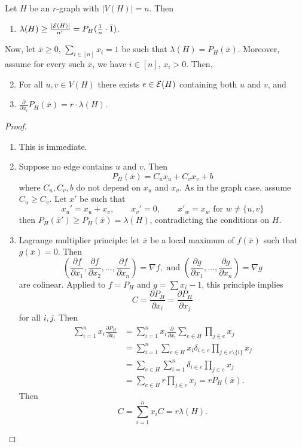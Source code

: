 \begin{lemma} \label{lem:6p1}
Let $H$ be an $r$-graph with $|V(H)|=n$. Then
\begin{enumerate}
	\item\label{lem:6p1p1}$\lambda(H)\geq \frac{|\mathcal{E} (H)|}{n^r} = P_H(\frac{1}{n}\cdot \bar 1)$.
\end{enumerate}
	Now, let $\bar x\geq 0$, $\sum_{i\in[n]}x_i = 1$ be such that $\lambda(H) = P_H(\bar x)$. Moreover, assume for every such $\bar x$, we have  $i\in[n]$, $x_i > 0$. Then,
\begin{enumerate}\setcounter{enumi}{1}
	\item\label{lem:6p1p2} For all $u,v\in V(H)$ there exists $e\in \mathcal{E} (H)$  containing both $u$ and $v$, and 
	\item\label{lem:6p1p3} $\frac{\partial }{\partial x_i} P_H(\bar x) = r \cdot \lambda(H)$.

\end{enumerate}

\end{lemma}
\begin{proof}	
\begin{enumerate}
	\item This is immediate.
	\item Suppose no edge contains $u$ and $v$. Then 
	\[
	 P_H(\bar x) = C_u x_u + C_v x_v + b
	 \] 
	 where $C_u,C_v, b$ do not depend on $x_u$ and $x_v$. As in the graph case, assume $C_u\geq C_v$. Let $x'$ be such that
	 \[
	 x_u'  = x_u + x_v, \qquad x_v' = 0, \qquad x'_w = x_w \text{ for }w\neq \{u,v\}
	 \]
	 then $P_H(\bar x') \geq P_H(\bar x) = \lambda (H)$, contradicting the conditions on $H$. 
	 \item Lagrange multiplier principle: let $\bar x$ be a local maximum of $f(\bar x)$ such that $g(\bar x)=0$. Then 
	 \[
	 \left( \frac{\partial f}{\partial x_1}, \frac{\partial f}{\partial x_2},\dotsc, \frac{\partial f}{\partial x_n} \right) = \nabla f, \text{ and } \left( \frac{\partial g}{\partial x_1}, \dotsc, \frac{\partial g}{\partial x_n} \right) = \nabla g
	 \]
	 are colinear. Applied to $f = P_H$ and $g = \sum x_i -1$, this principle implies
	 \[
	 C = \frac{\partial P_H}{\partial x_i} = \frac{\partial P_H}{\partial x_j}
	 \]
	 for all $i,j$. Then
	 \begin{align*}	
	 \sum_{i=1}^n x_i \frac{\partial P_H}{\partial x_i} &= \sum_{i=1}^n x_i \frac{\partial}{\partial x_i}  \sum_{e\in H} \prod_{j\in e} x_j\\
	 &=\sum_{i=1}^n \sum_{e\in H} x_i   \delta_{i\in e}\prod_{j\in e\setminus \{i\}} x_j\\
	 &=\sum_{e\in H} \sum_{i=1}^n \delta_{i\in e}  \prod_{j\in e} x_j\\
	 &= \sum_{e\in H} r \prod_{j\in e} x_j
	 =r P_H(\bar x).
	 \end{align*}
	 Then
	 \[
	 C = \sum_{i=1}^n x_i C = r \lambda (H).
	 \]
\end{enumerate}
\end{proof}


